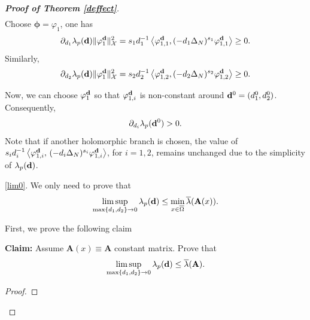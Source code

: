 \documentclass[a4paper,11pt]{amsart}
\theoremstyle{definition}
\def\O{\Omega}
\numberwithin{equation}{section}
\theoremstyle{definition}
\def\O{\Omega}
\begin{document}
\begin{proof} [\bf Proof of Theorem \ref{deffect}]
\begin{align*}
\end{align*}
Choose $\boldsymbol{\phi}=\varphi_1$, one has
\begin{align*}
\partial_{d_1}\lambda_p({\bf d})\|\varphi _{1}^{\bf d}\|_{\mathcal{X}}^2=s_1 d_1^{-1} \left<\varphi _{1,1}^{\bf d},(-d_1\Delta_N)^{s_1}\varphi_{1,1}^{\bf d}\right>\geq 0.
\end{align*}
Similarly,
\begin{align*}
\partial_{d_2}\lambda_p({\bf d})\|\varphi _{1}^{\bf d}\|_{\mathcal{X}}^2=s_2 d_2^{-1} \left<\varphi _{1,2}^{\bf d},(-d_2\Delta_N)^{s_2}\varphi_{1,2}^{\bf d}\right>\geq 0.
\end{align*}

Now, we can choose $\varphi_1^{\bf d}$ so that $\varphi_{1,i}^{\bf d}$ is non-constant around ${\bf d}^0=(d_1^0,d_2^0)$. Consequently,
\begin{align*}
\partial_{d_i}\lambda_p({\bf d}^0)>0.
\end{align*}
Note that if another holomorphic branch is chosen, the value of $
s_i d_i^{-1} \left\langle \varphi_{1,i}^{\bf d},\, (-d_i\Delta_N)^{s_i}\varphi_{1,i}^{\bf d} \right\rangle$, for $i=1,2$, remains unchanged due to the simplicity of $\lambda_p({\bf d})$.


\ref{lim0}. We only need to prove that
\begin{align*}
\limsup\limits_{\max\{d_1,d_2\}\rightarrow 0} \lambda_p({\bf d})\leq \min\limits_{x\in \overline{\O}}\overline{\lambda}({\bf A}(x)).
\end{align*}

First, we prove the following claim

\textbf{Claim:} Assume $\textbf{A}(x)\equiv\textbf{A}$ constant matrix. Prove that
\begin{align*}
\limsup\limits_{\max\{d_1,d_2\}\rightarrow 0} \lambda_p({\bf d})\leq \overline{\lambda}({\bf A}).
\end{align*}

\begin{proof}



\end{proof}
\end{proof}
\end{document}
